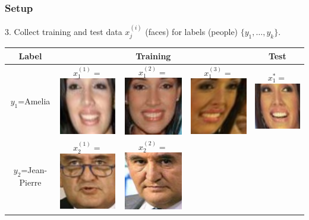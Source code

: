 \documentclass{beamer}
\begin{document}
\begin{frame}
\frametitle{Setup}

\vspace{0.1in}
3. Collect training and test data $x_j^{(i)}$ (faces) for labels (people) $\{y_1,\hdots, y_k\}$.

\begin{center}
\begin{tabular}{|c|ccc|c|}
\hline
Label & & Training & & Test\\ \hline
$y_1$=Amelia & 
  $x_1^{(1)} = $\includegraphics[scale = 0.2]{face_photos/Amelia_Vega_0001.png} &  
  $x_1^{(2)} = $\includegraphics[scale = 0.2]{face_photos/Amelia_Vega_0002.png} &  
  $x_1^{(3)} = $\includegraphics[scale = 0.2]{face_photos/Amelia_Vega_0003.png} &  
  $x_1^{*} = $\includegraphics[scale = 0.2]{face_photos/Amelia_Vega_0004.png} \\ \hline
$y_2$=Jean-Pierre & 
  $x_2^{(1)} = $\includegraphics[scale = 0.2]{face_photos/Jean-Pierre_Raffarin_0001.png} &  
  $x_2^{(2)} = $\includegraphics[scale = 0.2]{face_photos/Jean-Pierre_Raffarin_0002.png} &  

\end{tabular}
\end{center}
\end{frame}
\end{document}
